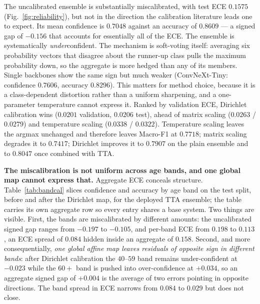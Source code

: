 \documentclass[journal]{IEEEtran}
\begin{document}
The uncalibrated ensemble is substantially miscalibrated, with test ECE $0.1575$
(Fig.~\ref{fig:reliability}), but not in the direction the calibration literature leads one
to expect. Its mean confidence is $0.7048$ against an accuracy of $0.8609$ --- a signed gap
of $-0.156$ that accounts for essentially all of the ECE. The ensemble is systematically
\emph{under}confident. The mechanism is soft-voting itself: averaging six probability
vectors that disagree about the runner-up class pulls the maximum probability down, so the
aggregate is more hedged than any of its members. Single backbones show the same sign but
much weaker (ConvNeXt-Tiny: confidence $0.7606$, accuracy $0.8296$). This matters for method
choice, because it is a class-dependent distortion rather than a uniform sharpening, and a
one-parameter temperature cannot express it. Ranked by validation ECE, Dirichlet calibration
wins
($0.0201$ validation, $0.0206$ test), ahead of matrix scaling ($0.0263$ / $0.0279$) and
temperature scaling ($0.0338$ / $0.0322$). Temperature scaling leaves the argmax unchanged
and therefore leaves Macro-F1 at $0.7718$; matrix scaling degrades it to $0.7417$; Dirichlet
improves it to $0.7907$ on the plain ensemble and to $0.8047$ once combined with TTA.

\textbf{The miscalibration is not uniform across age bands, and one global map cannot express
that.} Aggregate ECE conceals structure. Table~\ref{tab:bandcal} slices confidence and
accuracy by age band on the test split, before and after the Dirichlet map, for the deployed
TTA ensemble; the table carries its own aggregate row so every entry shares a base system.
Two things are visible. First, the bands are miscalibrated by different amounts: the
uncalibrated signed gap ranges from $-0.197$ to $-0.105$, and per-band ECE from $0.198$ to
$0.113$, an ECE spread of $0.084$ hidden inside an aggregate of $0.158$. Second, and more
consequentially, \emph{one global affine map leaves residuals of opposite sign in different
bands}: after Dirichlet calibration the $40$--$59$ band remains under-confident at $-0.023$
while the $60+$ band is pushed into over-confidence at $+0.034$, so an aggregate signed gap of
$+0.004$ is the average of two errors pointing in opposite directions. The band spread in ECE
narrows from $0.084$ to $0.029$ but does not close.
\end{document}
